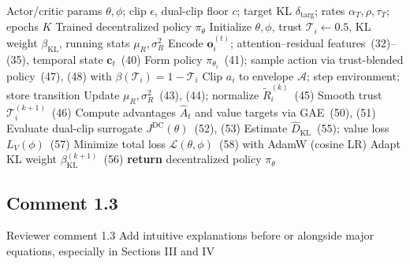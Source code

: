 \documentclass[11pt]{article}
\begin{document}
\begin{algorithm}[H]
\caption{ART-MAPPO Training for Cooperative Swarm Interception (CTDE)}
\begin{algorithmic}[1]
\REQUIRE Actor/critic params $\theta,\phi$; clip $\epsilon$, dual-clip floor $c$; target KL $\delta_{\mathrm{targ}}$; rates $\alpha_T,\rho,\tau_T$; epochs $K$
\ENSURE Trained decentralized policy $\pi_{\theta}$
\STATE Initialize $\theta,\phi$, trust $\mathcal{T}_i\!\leftarrow\!0.5$, KL weight $\beta_{\mathrm{KL}}$, running stats $\mu_R,\sigma_R^2$
    \STATE Encode $\mathbf{o}_i^{(t)}$; attention--residual features~(32)--(35), temporal state $\mathbf{c}_t$~(40)
    \STATE Form policy $\pi_{\theta_i}$~(41); sample action via trust-blended policy~(47), (48) with $\beta(\mathcal{T}_i)=1-\mathcal{T}_i$
    \STATE Clip $a_i$ to envelope $\mathcal{A}$; step environment; store transition
  \ENDFOR
  \STATE Update $\mu_R,\sigma_R^2$~(43), (44); normalize $\tilde{R}_i^{(k)}$~(45)
  \STATE Smooth trust $\mathcal{T}_i^{(k+1)}$~(46)
  \STATE Compute advantages $\hat{A}_t$ and value targets via GAE~(50), (51)
    \STATE Evaluate dual-clip surrogate $J^{\mathrm{DC}}(\theta)$~(52), (53)
    \STATE Estimate $\hat{D}_{\mathrm{KL}}$~(55); value loss $L_V(\phi)$~(57)
    \STATE Minimize total loss $\mathcal{L}(\theta,\phi)$~(58) with AdamW (cosine LR)
  \ENDFOR
  \STATE Adapt KL weight $\beta_{\mathrm{KL}}^{(k+1)}$~(56)
\ENDFOR
\STATE \textbf{return} decentralized policy $\pi_{\theta}$
\end{algorithmic}
\end{algorithm}



\subsection*{Comment 1.3 }

\begin{reviewercomment}{Reviewer comment 1.3}
Add intuitive explanations before or alongside major equations, especially in Sections III and IV

\end{reviewercomment}
\end{document}
